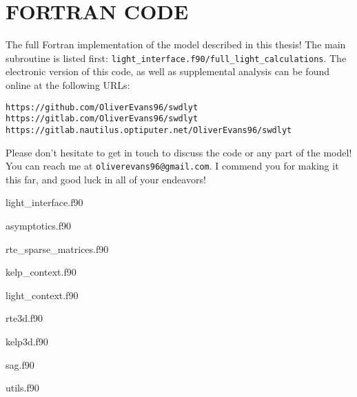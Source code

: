 \chapter{FORTRAN CODE}
\label{chap:fortran}

The full Fortran implementation of the model described in this thesis!
The main subroutine is listed first: \texttt{light\_interface.f90/full\_light\_calculations}.
The electronic version of this code, as well as supplemental analysis can be found online at the following URLs:

\begin{verbatim}
https://github.com/OliverEvans96/swdlyt
https://gitlab.com/OliverEvans96/swdlyt
https://gitlab.nautilus.optiputer.net/OliverEvans96/swdlyt
\end{verbatim}

Please don't hesitate to get in touch to discuss the code or any part of the model!
You can reach me at \texttt{oliverevans96@gmail.com}.
I commend you for making it this far, and good luck in all of your endeavors!

light\_interface.f90


asymptotics.f90


rte\_sparse\_matrices.f90


kelp\_context.f90


light\_context.f90


rte3d.f90


kelp3d.f90


sag.f90


utils.f90


